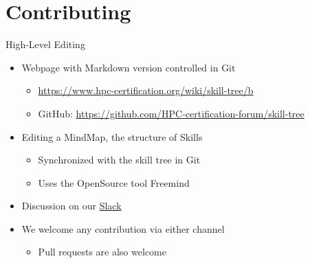 \documentclass[compress,aspectratio=169]{beamer}
\begin{document}
\section{Contributing}

\begin{frame}{High-Level Editing}
  \begin{itemize}
    \item Webpage with Markdown version controlled in Git
      \begin{itemize}
        \item \url{https://www.hpc-certification.org/wiki/skill-tree/b}
        \item GitHub: \url{https://github.com/HPC-certification-forum/skill-tree}
      \end{itemize}
    \item Editing a MindMap, the structure of Skills
      \begin{itemize}
        \item Synchronized with the skill tree in Git
        \item Uses the OpenSource tool Freemind
      \end{itemize}
    \item Discussion on our \href{https://join.slack.com/t/hpc-certification/shared_invite/enQtMzUwNzU3NzM2MTkzLTAzZWM3NDg0N2I2ZmQwOWI5ZGUwNjNlNDgzM2RmOTM3ZWRjNjIxYTc5NzUxYTJhNmRlNmM5YmE1NDY3YzkzYzA}{Slack}
    \item We welcome any contribution via either channel
      \begin{itemize}
        \item Pull requests are also welcome
      \end{itemize}
  \end{itemize}
\end{frame}
\end{document}
